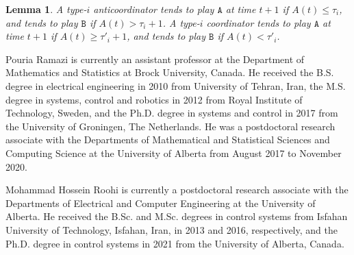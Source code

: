 \documentclass[10 pt,twocolumn,journal]{IEEEtran}
\DeclarePairedDelimiter{\floor}{\lfloor}{\rfloor}
\theoremstyle{plain}
\newtheorem{lemma}{Lemma}
\newcommand{\A}{\mathcal{A}}
\renewcommand{\A}{\mathtt{A}}
\newcommand{\B}{\mathtt{B}}
\theoremstyle{definition}
\begin{document}
\begin{lemma} \label{lem_updateRule2}
    A type-$i$ anticoordinator tends to play $\A$ at time $t+1$ if $A(t) \leq \tau_i$, 
    and tends to play $\B$ if $A(t) > \tau_i +1$.
    A type-$i$ coordinator tends to play $\A$ at time $t+1$ if $A(t) \geq \tau'_i +1$, and tends to play $\B$ if $A(t) < \tau'_i$.
\end{lemma}

	
%	
\begin{IEEEbiography}%
{Pouria Ramazi}
is currently an assistant professor at the Department of Mathematics and Statistics at Brock University, Canada. 
	He received the B.S. degree in electrical engineering in 2010 from University of Tehran, Iran, the M.S. degree in systems, control and robotics in 2012 from Royal Institute of Technology, Sweden, and the Ph.D. degree in systems and control in 2017 from the University of Groningen, The Netherlands. 
	He was a postdoctoral research associate with the Departments of Mathematical and Statistical Sciences and Computing Science at the University of Alberta from August 2017 to November 2020.
\end{IEEEbiography}
\begin{IEEEbiography}[]{Mohammad Hossein Roohi} is currently a postdoctoral research associate with the Departments of Electrical and Computer Engineering at the University of Alberta.
He received the B.Sc. and M.Sc. degrees in control systems from Isfahan University of Technology, Isfahan, Iran, in 2013 and 2016, respectively, and the Ph.D. degree in control systems in 2021 from the University of Alberta, Canada. 
\end{IEEEbiography}
\end{document}

